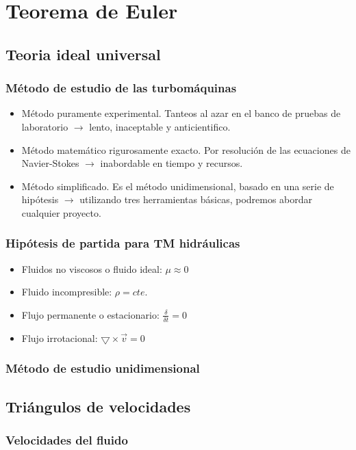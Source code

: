 \chapter{Teorema de Euler}
\section{Teoria ideal universal}
\subsection{Método de estudio de las turbomáquinas}
\begin{itemize}
    \item Método puramente experimental. Tanteos al azar en el banco de pruebas de laboratorio $\rightarrow$ lento, inaceptable y anticientifico.
    \item Método matemático rigurosamente exacto. Por resolución de las ecuaciones de Navier-Stokes $\rightarrow$ inabordable en tiempo y recursos.
    \item Método simplificado. Es el método unidimensional, basado en una serie de hipótesis $\rightarrow$ utilizando tres herramientas básicas, podremos abordar cualquier proyecto.
\end{itemize}

\subsection{Hipótesis de partida para TM hidráulicas}
\begin{itemize}
    \item Fluidos no viscosos o fluido ideal: $\mu \approx 0$
    \item Fluido incompresible: $\rho = cte.$
    \item Flujo permanente o estacionario: $\frac{\delta}{\delta t} = 0$
    \item Flujo irrotacional: $\bigtriangledown \times \vec{v} = 0$
\end{itemize}

\subsection{Método de estudio unidimensional}

\section{Triángulos de velocidades}

\subsection{Velocidades del fluido}

